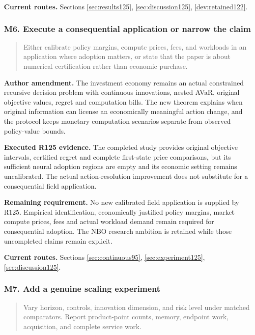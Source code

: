 \noindent\textbf{Current routes.} Sections \ref{sec:results125}, \ref{sec:discussion125}, \ref{dev:retained122}.

\subsubsection{M6. Execute a consequential application or narrow the claim}

\begin{quote}\small
Either calibrate policy margins, compute prices, fees, and workloads in an application where adoption matters, or state that the paper is about numerical certification rather than economic purchase.
\end{quote}

\noindent\textbf{Author amendment.} The investment economy remains an actual constrained recursive decision problem with continuous innovations, nested AVaR, original objective values, regret and computation bills. The new theorem explains when original information can license an economically meaningful action change, and the protocol keeps monetary computation scenarios separate from observed policy-value bounds.

\noindent\textbf{Executed R125 evidence.} The completed study provides original objective intervals, certified regret and complete first-state price comparisons, but its sufficient neural adoption regions are empty and its economic setting remains uncalibrated. The actual action-resolution improvement does not substitute for a consequential field application.

\noindent\textbf{Remaining requirement.} No new calibrated field application is supplied by R125. Empirical identification, economically justified policy margins, market compute prices, fees and actual workload demand remain required for consequential adoption. The NBO research ambition is retained while those uncompleted claims remain explicit.

\noindent\textbf{Current routes.} Sections \ref{sec:continuous95}, \ref{sec:experiment125}, \ref{sec:discussion125}.

\subsubsection{M7. Add a genuine scaling experiment}

\begin{quote}\small
Vary horizon, controls, innovation dimension, and risk level under matched comparators. Report product-point counts, memory, endpoint work, acquisition, and complete service work.
\end{quote}


